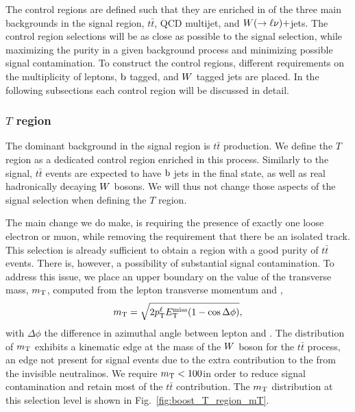 
The control regions are defined such that they are enriched in of the three main backgrounds in the
signal region, $t\bar{t}$, QCD multijet, and $W(\rightarrow \ell \nu)+$jets. The control region
selections will be as close as possible to the signal selection, while maximizing the purity in a
given background process and minimizing possible signal contamination. 
To construct the control regions, different requirements on the 
multiplicity of leptons, $\mathrm{b}$ tagged, and $W$ tagged jets are placed. 
In the following subsections each control region will be discussed in detail. 

\subsubsection{\texorpdfstring{$T$}{T} region \label{sec:boost_T_region}}

The dominant background in the signal region is $t\bar{t}$ production. We define the $T$ region as a
dedicated control region enriched in this process. 
Similarly to the signal, $t\bar{t}$ events are expected to have $\mathrm{b}$ jets in the final state, as
well as real hadronically decaying $W$ bosons. We will thus not change those aspects of the signal
selection when defining the $T$ region. 

The main change we do make, is requiring the presence of exactly one loose electron or muon, while
removing the requirement that there be an isolated track. This selection is already sufficient to
obtain a region with a good purity of $t\bar{t}$ events. There is, however, a possibility of
substantial signal contamination. To address this issue, we place an upper boundary on the value of
the transverse mass, $m_{\mathrm{T}}$, computed from the lepton transverse momentum and \VEtmiss, 
\begin{equation}
 m_{\mathrm{T}} = \sqrt{2p_{\mathrm{T}}^\ell E_{\mathrm{T}}^{\text{miss}} ( 1 - \cos\Delta\phi )},
\end{equation}
with $\Delta\phi$ the difference in azimuthal angle between lepton and \VEtmiss. 
The distribution of $m_{\mathrm{T}}$ exhibits a kinematic edge at the mass of the $W$ boson for the $t\bar{t}$
process, an edge not present for signal events due to the extra contribution to the \ETm from the
invisible neutralinos.  We require $m_{\mathrm{T}} < 100$\GeV in order to reduce signal contamination and
retain most of the $t\bar{t}$ contribution. The $m_{\mathrm{T}}$ distribution at this selection level is shown
in Fig.~\ref{fig:boost_T_region_mT}. 


